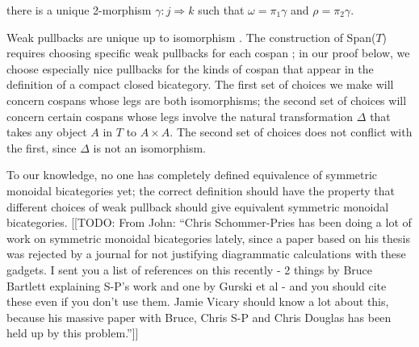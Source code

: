 \documentclass[12pt,twoside,openright]{report}
\newcommand{\maps}{\colon}
\begin{document}
\begin{center}
\end{center}
there is a unique 2-morphism $\gamma\maps j \Rightarrow k$ such that $\omega = \pi_1\gamma$ and $\rho = \pi_2\gamma.$

Weak pullbacks are unique up to isomorphism \cite{nlab2pullbacks}.  The construction of Span($T$) requires choosing specific weak pullbacks for each cospan \cite[3.2.1]{Hoffnung}; in our proof below, we choose especially nice pullbacks for the kinds of cospan that appear in the definition of a compact closed bicategory.  The first set of choices we make will concern cospans whose legs are both isomorphisms; the second set of choices will concern certain cospans whose legs involve the natural transformation $\Delta$ that takes any object $A$ in $T$ to $A \times A.$  The second set of choices does not conflict with the first, since $\Delta$ is not an isomorphism.

To our knowledge, no one has completely defined equivalence of symmetric monoidal bicategories yet; the correct definition should have the property that different choices of weak pullback should give equivalent symmetric monoidal bicategories. [[TODO: From John: ``Chris Schommer-Pries has been doing a lot of work on symmetric monoidal bicategories lately, since a paper based on his thesis was rejected by a journal for not justifying diagrammatic calculations with these gadgets.  I sent you a list of references on this recently - 2 things by Bruce Bartlett explaining S-P's work and one by Gurski et al - and you should cite these even if you don't use them.  Jamie Vicary should know a lot about this, because his massive paper with Bruce, Chris S-P and Chris Douglas has been held up by this problem.'']]
\end{document}
